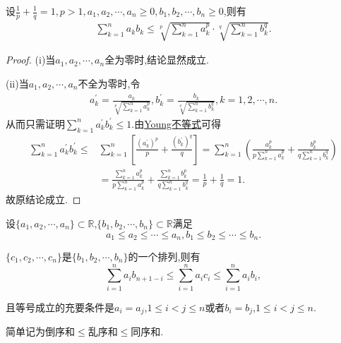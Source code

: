 \documentclass[../../main.tex]{subfiles}%
\begin{document}
\begin{theorem}[离散的Hölder不等式]\label{theorem:离散的Hölder不等式}
设$\frac{1}{p}+\frac{1}{q}=1,p>1,a_1,a_2,\cdots,a_n\geqslant 0,b_1,b_2,\cdots,b_n\geqslant 0$,则有
\begin{align*}
\sum\limits_{k=1}^n{a_kb_k}\leqslant \sqrt[p]{\sum\limits_{k=1}^n{a_{k}^{p}}}\cdot \sqrt[q]{\sum\limits_{k=1}^n{b_{k}^{q}}}.
\end{align*}
\end{theorem}
\begin{proof}
(i)当$a_1,a_2,\cdots,a_n$全为零时,结论显然成立.

(ii)当$a_1,a_2,\cdots,a_n$不全为零时,令
\begin{align*}
a_{k}^{\prime}=\frac{a_k}{\sqrt[p]{\sum\limits_{k=1}^n{a_{k}^{p}}}},b_{k}^{\prime}=\frac{b_k}{\sqrt[q]{\sum\limits_{k=1}^n{b_{k}^{q}}}},k=1,2,\cdots,n.
\end{align*}
从而只需证明$\sum\limits_{k=1}^n{a_{k}^{\prime}b_{k}^{\prime}}\leqslant 1$.由\hyperref[theorem:Young不等式]{Young不等式}可得
\begin{align*}
\sum\limits_{k=1}^n{a_{k}^{\prime}b_{k}^{\prime}}\leqslant &\sum\limits_{k=1}^n{\left[ \frac{\left( a_{k}^{\prime} \right) ^p}{p}+\frac{\left( b_{k}^{\prime} \right) ^q}{q} \right]}=\sum\limits_{k=1}^n{\left( \frac{a_{k}^{p}}{p\sum\limits_{k=1}^n{a_{k}^{p}}}+\frac{b_{k}^{p}}{q\sum\limits_{k=1}^n{b_{k}^{q}}} \right)}
\\
&=\frac{\sum\limits_{k=1}^n{a_{k}^{p}}}{p\sum\limits_{k=1}^n{a_{k}^{p}}}+\frac{\sum\limits_{k=1}^n{b_{k}^{p}}}{q\sum\limits_{k=1}^n{b_{k}^{q}}}=\frac{1}{p}+\frac{1}{q}=1.
\end{align*}
故原结论成立.
\end{proof}

\begin{theorem}[排序和不等式]\label{theorem:排序和不等式}
设\(\{a_1,a_2,\cdots,a_n\} \subset \mathbb{R}\),\(\{b_1,b_2,\cdots,b_n\} \subset \mathbb{R}\)满足
\[
a_1 \leqslant  a_2 \leqslant  \cdots \leqslant  a_n, b_1 \leqslant  b_2 \leqslant  \cdots \leqslant  b_n.
\]

\(\{c_1,c_2,\cdots,c_n\}\)是\(\{b_1,b_2,\cdots,b_n\}\)的一个排列,则有
\[
\sum\limits_{i = 1}^{n} a_i b_{n + 1 - i} \leqslant  \sum\limits_{i = 1}^{n} a_i c_i \leqslant  \sum\limits_{i = 1}^{n} a_i b_i,
\]

且等号成立的充要条件是\(a_i = a_j\),\(1 \leqslant  i < j \leqslant  n\)或者\(b_i = b_j\),\(1 \leqslant  i < j \leqslant  n\).
\end{theorem}
\begin{note}
简单记为倒序和\(\leqslant \)乱序和\(\leqslant \)同序和.
\end{note}
\end{document}
